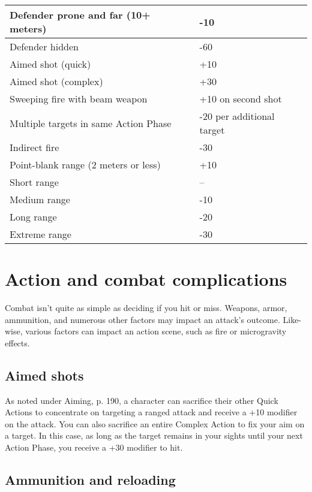 \begin{table}
\begin{tabularx}{\textwidth}{|X|l|}
\hline
Defender prone and far (10+ meters) 	& -10				\\
\hline
Defender hidden 					& -60				\\
\hline
Aimed shot (quick) 					& +10				\\
\hline
Aimed shot (complex) 				& +30				\\
\hline
Sweeping fire with beam weapon 		& +10 on second shot	\\
\hline
Multiple targets in same Action Phase 	& -20 per additional target \\
\hline
Indirect fire 						& -30				\\
\hline
Point-blank range (2 meters or less) 	& +10				\\
\hline
Short range 						& --					\\
\hline
Medium range 						& -10				\\
\hline
Long range 						& -20				\\
\hline
Extreme range 						& -30				\\
\hline
\end{tabularx}
\label{tab:combat-modifiers}
\end{table}


\section{Action and combat complications}
\label{sec:action-combat-comp}

Combat isn’t quite as simple as deciding if you hit or miss. Weapons, armor, ammunition, and numerous other factors may impact an attack’s outcome. Like- wise, various factors can impact an action scene, such as fire or microgravity effects.


\subsection{Aimed shots}
\label{sec:aimed-shots}

As noted under Aiming, p. 190, a character can sacrifice their other Quick Actions to concentrate on targeting a ranged attack and receive a +10 modifier on the attack. You can also sacrifice an entire Complex Action to fix your aim on a target. In this case, as long as the target remains in your sights until your next Action Phase, you receive a +30 modifier to hit.


\subsection{Ammunition and reloading}
\label{sec:ammunition-reloading}

